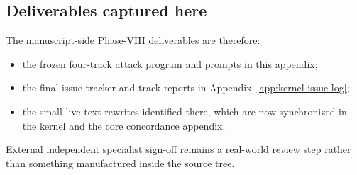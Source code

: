 \subsection*{Deliverables captured here}
The manuscript-side Phase-VIII deliverables are therefore:
\begin{itemize}
    \item the frozen four-track attack program and prompts in this appendix;
    \item the final issue tracker and track reports in Appendix~\ref{app:kernel-issue-log};
    \item the small live-text rewrites identified there, which are now synchronized in the kernel and the core concordance appendix.
\end{itemize}
External independent specialist sign-off remains a real-world review step rather than something manufactured inside the source tree.
